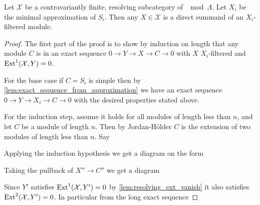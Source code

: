\begin{theorem} \cite[3.8]{AR91}
	Let $\mathcal X$ be a contravariantly finite, resolving subcategory of $\mod \Lambda$. Let $X_i$ be the minimal approximation of $S_i$. Then any $X \in \mathcal X$ is a direct summand of an $X_i$-filtered module.
	\begin{proof}
		The first part of the proof is to show by induction on length that any module $C$ is in an exact sequence $0 \to Y \to X \to C \to 0$ with $X$ $X_i$-filtered and $\operatorname{Ext}^1(\mathcal X, Y)=0$.
		
		For the base case if $C=S_i$ is simple then by \cref{lem:exact_sequence_from_approximation} we have an exact sequence $0 \to Y \to X_i \to C \to 0$ with the desired properties stated above. 
		
		For the induction step, assume it holds for all modules of length less than $n$, and let $C$ be a module of length $n$. Then by Jordan-Hölder $C$ is the extension of two modules of length less than $n$. Say
		\begin{center}
		\end{center}
		Applying the induction hypothesis we get a diagram on the form
		\begin{center}
		\end{center}
		Taking the pullback of $X'' \to C''$ we get a diagram
		\begin{center}
		\end{center}
		Since $Y'$ satisfies $\operatorname{Ext}^1(\mathcal X, Y') = 0$ by \cref{lem:resolving_ext_vanish} it also satisfies $\operatorname{Ext}^2(\mathcal X, Y')=0$. In particular from the long exact sequence

\end{proof}
\end{theorem}
